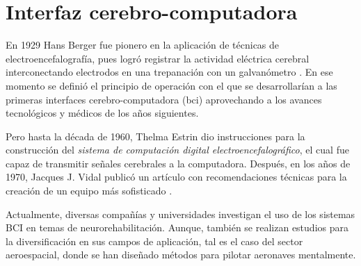         

\section{Interfaz cerebro-computadora}\label{sec:theory bci}

    En 1929 Hans Berger fue pionero en la aplicación de técnicas de electroencefalografía, pues logró registrar la actividad eléctrica cerebral interconectando electrodos en una trepanación con un galvanómetro \cite{Kuebler2019,BrandLab2019}. En ese momento se definió el principio de operación con el que se desarrollarían a las primeras interfaces cerebro-computadora (\acrshort{bci}) aprovechando a los avances tecnológicos y médicos de los años siguientes.
    
    Pero hasta la década de 1960, Thelma Estrin dio instrucciones para la construcción del \textit{sistema de computación digital electroencefalográfico}, el cual fue capaz de transmitir señales cerebrales a la computadora. Después, en los años de 1970, Jacques J. Vidal publicó un artículo con recomendaciones técnicas para la creación de un equipo más sofisticado \cite{Kuebler2019}.
    
    Actualmente, diversas compañías y universidades investigan el uso de los sistemas BCI en temas de neurorehabilitación. Aunque, también se realizan estudios para la diversificación en sus campos de aplicación, tal es el caso del sector aeroespacial, donde se han diseñado métodos para pilotar aeronaves mentalmente. 

